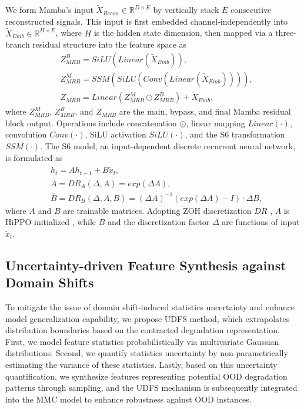 \documentclass[lettersize,journal]{IEEEtran}
\begin{document}
We form Mamba's input $\widetilde{X}_{Recon} \in \mathbb{R}^{D \times E}$ by vertically stack $E$ consecutive reconstructed signals.
This input is first embedded channel-independently into $\widetilde{X}_{Emb} \in \mathbb{R}^{H \times E}$, where $H$ is the hidden state dimension, then mapped via a three-branch residual structure into the feature space as
\begin{align}
& Z^{B}_{MRB} = SiLU(Linear(\widetilde{X}_{Emb})), \\
& Z^{M}_{MRB} = SSM(SiLU(Conv(Linear(\widetilde{X}_{Emb})))), \\
& Z_{MRB} = Linear(Z^{M}_{MRB} \odot Z^{B}_{MRB}) + \widetilde{X}_{Emb},
\end{align}
where $Z^{M}_{MRB}$, $Z^{B}_{MRB}$, and $Z_{MRB}$ are the main, bypass, and final Mamba residual block output. Operations include concatenation $\odot$, linear mapping $Linear(\cdot)$, convolution $Conv(\cdot)$, SiLU activation $SiLU(\cdot)$, and the S6 transformation $SSM(\cdot)$. The S6 model, an input-dependent discrete recurrent neural network, is formulated as
\begin{align}
& h_{t} = \overline{A}h_{t-1} + \overline{B}\widetilde{x}_{t}, \\
& \overline{A} = DR_{A}(\Delta, A) = exp(\Delta A), \\
& \overline{B} = DR_{B}(\Delta, A, B) = (\Delta A)^{-1}(exp(\Delta A)-I)\cdot\Delta B,
\end{align}
where $A$ and $B$ are trainable matrices. Adopting ZOH discretization $DR$ \cite{gu2024mamba}, $A$ is HiPPO-initialized \cite{20212610553629}, while $B$ and the discretization factor $\Delta$ are functions of input $\widetilde{x}_{t}$.

\subsection{Uncertainty-driven Feature Synthesis against Domain Shifts}\label{subsec:UDFS}

To mitigate the issue of domain shift-induced statistics uncertainty and enhance model generalization capability, we propose UDFS method, which extrapolates distribution boundaries based on the contracted degradation representation.
First, we model feature statistics probabilistically via multivariate Gaussian distributions.
Second, we quantify statistics uncertainty by non-parametrically estimating the variance of these statistics.
Lastly, based on this uncertainty quantification, we synthesize features representing potential OOD degradation patterns through sampling, and the UDFS mechanism is subsequently integrated into the MMC model to enhance robustness against OOD instances.
\end{document}
